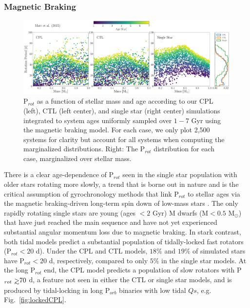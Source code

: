 \documentclass[twocolumn]{aastex61}
\def\gsim{~\rlap{$>$}{\lower 1.0ex\hbox{$\sim$}}}
\begin{document}
\subsubsection{\citet{Matt2015} Magnetic Braking} \label{sec:mattDist}


\begin{figure}[t]
	\includegraphics[width=\textwidth]{../Plots/protDist.pdf}
   \caption{P$_{rot}$ as a function of stellar mass and age according to our CPL (left), CTL (left center), and single star (right center) simulations integrated to system ages uniformly sampled over $1-7$ Gyr using the \citet{Matt2015} magnetic braking model. For each case, we only plot 2,500 systems for clarity but account for all systems when computing the marginalized distributions. Right: The P$_{rot}$ distribution for each case, marginalized over stellar mass.}%
    \label{fig:protDist}%
\end{figure}

There is a clear age-dependence of P$_{rot}$ seen in the single star population with older stars rotating more slowly, a trend that is borne out in nature and is the critical assumption of gyrochronology methods that link P$_{rot}$ to stellar ages via the magnetic braking-driven long-term spin down of low-mass stars \citep[e.g.][]{Skumanich1972,Barnes2003,Barnes2007,Mamajek2008,Barnes2010,Meibom2015}. The only rapidly rotating single stars are young (ages $< 2$ Gyr) M dwarfs (M$ < 0.5$ M$_{\odot}$) that have just reached the main sequence and have not yet experienced substantial angular momentum loss due to magnetic braking.  In stark contrast, both tidal models predict a substantial population of tidally-locked fast rotators (P$_{rot} < 20$ d). Under the CPL and CTL models, $18\%$ and $19\%$ of simulated stars have P$_{rot} < 20 $ d, respectively, compared to only $5\%$ in the single star models.  At the long P$_{rot}$ end, the CPL model predicts a population of slow rotators with P$_{rot} \gsim 70$ d, a feature not seen in either the CTL or single star models, and is produced by tidal-locking in long P$_{orb}$ binaries with low tidal $Qs$, e.g. Fig.~\ref{fig:lockedCPL}. 
\end{document}
